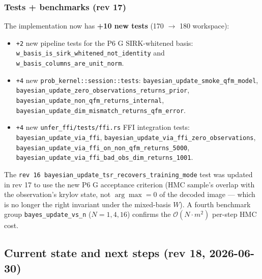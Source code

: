 \documentclass[11pt, a4paper]{article}
\begin{document}
\subsubsection*{Tests + benchmarks (rev 17)}

The implementation now has \textbf{+10 new tests} (170 $\to$ 180
workspace):

\begin{itemize}
\item \texttt{+2} new pipeline tests for the P6 G SIRK-whitened
  basis: \texttt{w\_basis\_is\_sirk\_whitened\_not\_identity} and
  \texttt{w\_basis\_columns\_are\_unit\_norm}.
\item \texttt{+4} new \texttt{prob\_kernel::session::tests}:
  \texttt{bayesian\_update\_smoke\_qfm\_model},
  \texttt{bayesian\_update\_zero\_observations\_returns\_prior},
  \texttt{bayesian\_update\_non\_qfm\_returns\_internal},
  \texttt{bayesian\_update\_dim\_mismatch\_returns\_qfm\_error}.
\item \texttt{+4} new \texttt{unfer\_ffi/tests/ffi.rs} FFI
  integration tests:
  \texttt{bayesian\_update\_via\_ffi},
  \texttt{bayesian\_update\_via\_ffi\_zero\_observations},
  \texttt{bayesian\_update\_via\_ffi\_on\_non\_qfm\_returns\_5000},
  \texttt{bayesian\_update\_via\_ffi\_bad\_obs\_dim\_returns\_1001}.
\end{itemize}

The \texttt{rev 16 bayesian\_update\_tsr\_recovers\_training\_mode}
test was updated in rev 17 to use the new P6 G acceptance
criterion (HMC sample's overlap with the observation's krylov
state, not $\arg\max = 0$ of the decoded image --- which is no
longer the right invariant under the mixed-basis $W$). A fourth
benchmark group \texttt{bayes\_update\_vs\_n} ($N = 1, 4, 16$)
confirms the $\mathcal{O}(N \cdot m^2)$ per-step HMC cost.

\subsection{Current state and next steps (rev 18, 2026-06-30)}
\end{document}
